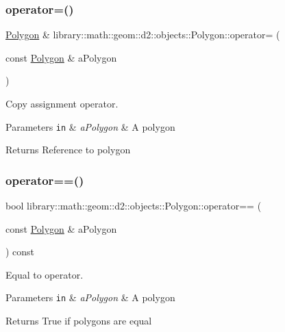 \subsubsection{\texorpdfstring{operator=()}{operator=()}}
{\footnotesize\ttfamily \hyperlink{classlibrary_1_1math_1_1geom_1_1d2_1_1objects_1_1_polygon}{Polygon} \& library\+::math\+::geom\+::d2\+::objects\+::\+Polygon\+::operator= (\begin{DoxyParamCaption}\item[{const \hyperlink{classlibrary_1_1math_1_1geom_1_1d2_1_1objects_1_1_polygon}{Polygon} \&}]{a\+Polygon }\end{DoxyParamCaption})}



Copy assignment operator. 


\begin{DoxyParams}[1]{Parameters}
\mbox{\tt in}  & {\em a\+Polygon} & A polygon \\
\hline
\end{DoxyParams}
\begin{DoxyReturn}{Returns}
Reference to polygon 
\end{DoxyReturn}
\mbox{\label{classlibrary_1_1math_1_1geom_1_1d2_1_1objects_1_1_polygon_a2d92051aa3535659ec1ca1849ea65fa0}} 
\subsubsection{\texorpdfstring{operator==()}{operator==()}}
{\footnotesize\ttfamily bool library\+::math\+::geom\+::d2\+::objects\+::\+Polygon\+::operator== (\begin{DoxyParamCaption}\item[{const \hyperlink{classlibrary_1_1math_1_1geom_1_1d2_1_1objects_1_1_polygon}{Polygon} \&}]{a\+Polygon }\end{DoxyParamCaption}) const}



Equal to operator. 


\begin{DoxyParams}[1]{Parameters}
\mbox{\tt in}  & {\em a\+Polygon} & A polygon \\
\hline
\end{DoxyParams}
\begin{DoxyReturn}{Returns}
True if polygons are equal 
\end{DoxyReturn}
\mbox{\label{classlibrary_1_1math_1_1geom_1_1d2_1_1objects_1_1_polygon_a028ca7818387654ed1aab1584cee6cc5}} 
